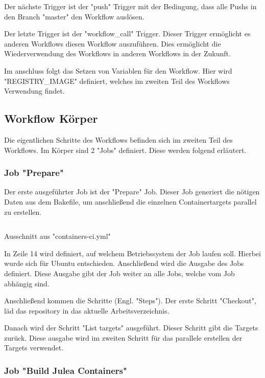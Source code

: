 Der nächste Trigger ist der "push" Trigger mit der Bedingung, dass alle Pushs in den Branch "master" den Workflow auslösen.

Der letzte Trigger ist der "workflow\_call" Trigger. Dieser Trigger ermöglicht es anderen Workflows diesen Workflow auszuführen. Dies ermöglicht die Wiederverwendung des Workflows in anderen Workflows in der Zukunft. 

Im anschluss folgt das Setzen von Variablen für den Workflow. Hier wird "REGISTRY\_IMAGE" definiert, welches im zweiten Teil des Workflows Verwendung findet.

\subsection{Workflow Körper}

Die eigentlichen Schritte des Workflows befinden sich im zweiten Teil des Workflows. Im Körper sind 2 "Jobs" definiert. Diese werden folgend erläutert.

\subsubsection{Job "Prepare"}

Der erste ausgeführter Job ist der "Prepare" Job. Dieser Job generiert die nötigen Daten aus dem Bakefile, um anschließend die einzelnen Containertargets parallel zu erstellen.

\begin{listing}[H]
    \inputminted[firstline=12,lastline=23]{yaml}{./code-examples/containers-ci.yml}
    \caption{Ausschnitt aus "containers-ci.yml"}
    \label{lst:containers-ci-12-23}
\end{listing}

In Zeile 14 wird definiert, auf welchem Betriebssystem der Job laufen soll. Hierbei wurde sich für Ubuntu entschieden. 
Anschließend wird die Ausgabe des Jobs definiert. Diese Ausgabe gibt der Job weiter an alle Jobs, welche vom Job abhängig sind.

Anschließend kommen die Schritte (Engl. "Steps"). Der erste Schritt "Checkout", läd das repository in das aktuelle Arbeitsverzeichnis.

Danach wird der Schritt "List targets" ausgeführt. Dieser Schritt gibt die Targets zurück. Diese ausgabe wird im zweiten Schritt für das parallele erstellen der Targets verwendet.

\subsubsection{Job "Build Julea Containers"}

